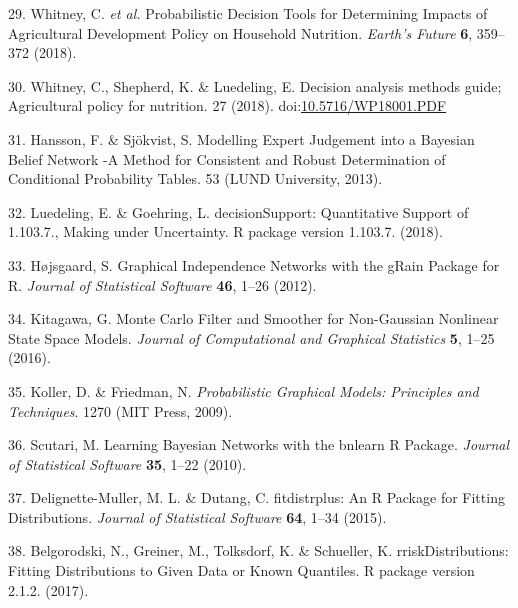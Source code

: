 \documentclass[12pt,oneside]{article}
\begin{document}
\leavevmode\hypertarget{ref-Whitney_et_al_2018}{}%
29. Whitney, C. \emph{et al.} Probabilistic Decision Tools for Determining Impacts of Agricultural Development Policy on Household Nutrition. \emph{Earth's Future} \textbf{6}, 359--372 (2018).

\leavevmode\hypertarget{ref-Whitney_et_al_2018a}{}%
30. Whitney, C., Shepherd, K. \& Luedeling, E. Decision analysis methods guide; Agricultural policy for nutrition. 27 (2018). doi:\href{https://doi.org/10.5716/WP18001.PDF}{10.5716/WP18001.PDF}

\leavevmode\hypertarget{ref-Hansson_and_Sjokvist_2013}{}%
31. Hansson, F. \& Sjökvist, S. Modelling Expert Judgement into a Bayesian Belief Network -A Method for Consistent and Robust Determination of Conditional Probability Tables. 53 (LUND University, 2013).

\leavevmode\hypertarget{ref-Luedeling_and_Goehring_2018}{}%
32. Luedeling, E. \& Goehring, L. decisionSupport: Quantitative Support of 1.103.7., Making under Uncertainty. R package version 1.103.7. (2018).

\leavevmode\hypertarget{ref-Hojsgaard_2012}{}%
33. Højsgaard, S. Graphical Independence Networks with the gRain Package for R. \emph{Journal of Statistical Software} \textbf{46}, 1--26 (2012).

\leavevmode\hypertarget{ref-Kitagawa_2016}{}%
34. Kitagawa, G. Monte Carlo Filter and Smoother for Non-Gaussian Nonlinear State Space Models. \emph{Journal of Computational and Graphical Statistics} \textbf{5}, 1--25 (2016).

\leavevmode\hypertarget{ref-Koller_and_Friedman_2009}{}%
35. Koller, D. \& Friedman, N. \emph{Probabilistic Graphical Models: Principles and Techniques}. 1270 (MIT Press, 2009).

\leavevmode\hypertarget{ref-Scutari_2010}{}%
36. Scutari, M. Learning Bayesian Networks with the bnlearn R Package. \emph{Journal of Statistical Software} \textbf{35}, 1--22 (2010).

\leavevmode\hypertarget{ref-Delignette-Muller_and_Dutang_2015}{}%
37. Delignette-Muller, M. L. \& Dutang, C. fitdistrplus: An R Package for Fitting Distributions. \emph{Journal of Statistical Software} \textbf{64}, 1--34 (2015).

\leavevmode\hypertarget{ref-Belgorodski_et_al_2017}{}%
38. Belgorodski, N., Greiner, M., Tolksdorf, K. \& Schueller, K. rriskDistributions: Fitting Distributions to Given Data or Known Quantiles. R package version 2.1.2. (2017).
\end{document}
